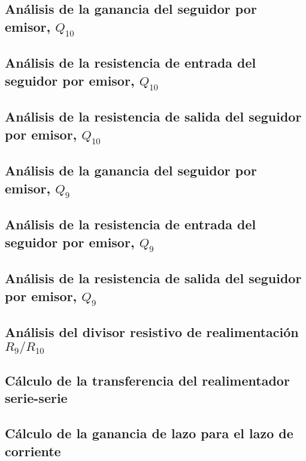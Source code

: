 

\subsection{Análisis de la ganancia del seguidor por emisor, $Q_{10}$}

\label{section:switch_small_signal_begin}

\subsection{Análisis de la resistencia de entrada del seguidor por emisor, $Q_{10}$}

\subsection{Análisis de la resistencia de salida del seguidor por emisor, $Q_{10}$}

\subsection{Análisis de la ganancia del seguidor por emisor, $Q_{9}$}

\subsection{Análisis de la resistencia de entrada del seguidor por emisor, $Q_{9}$}

\subsection{Análisis de la resistencia de salida del seguidor por emisor, $Q_{9}$}

\label{section:switch_small_signal_end}

\subsection{Análisis del divisor resistivo de realimentación $R_{9}/R_{10}$}

\subsection{Cálculo de la transferencia del realimentador serie-serie}

\subsection{Cálculo de la ganancia de lazo para el lazo de corriente}


